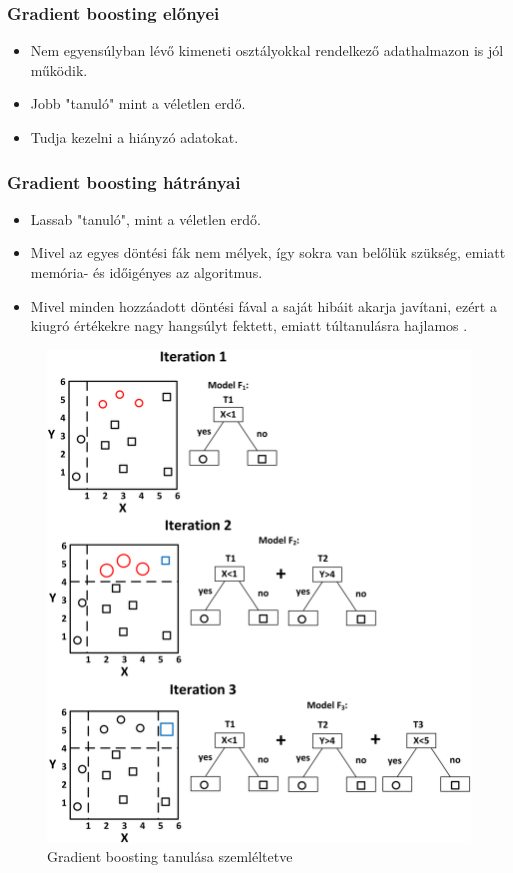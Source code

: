 \subsubsection{Gradient boosting előnyei}
\begin{itemize}
    \item Nem egyensúlyban lévő kimeneti osztályokkal rendelkező adathalmazon is jól működik.
    \item Jobb "tanuló" mint a véletlen erdő.
    \item Tudja kezelni a hiányzó adatokat.
\end{itemize}


\subsubsection{Gradient boosting hátrányai}
\begin{itemize}
    \item Lassab "tanuló", mint a véletlen erdő.
    \item Mivel az egyes döntési fák nem mélyek, így sokra van belőlük szükség, emiatt memória- és időigényes az algoritmus.
    \item Mivel minden hozzáadott döntési fával a saját hibáit akarja javítani, ezért a kiugró értékekre nagy hangsúlyt fektett, emiatt túltanulásra hajlamos \cite{gradient_boosting_2}.
\end{itemize}

\begin{figure}[h]
    \centering
    \includegraphics[scale=0.22]{images/3.fejezet/GradientBoosting.png}
    \caption{Gradient boosting tanulása szemléltetve \cite{gradient_abra}}
    \label{fig:gradientboosting}
\end{figure}